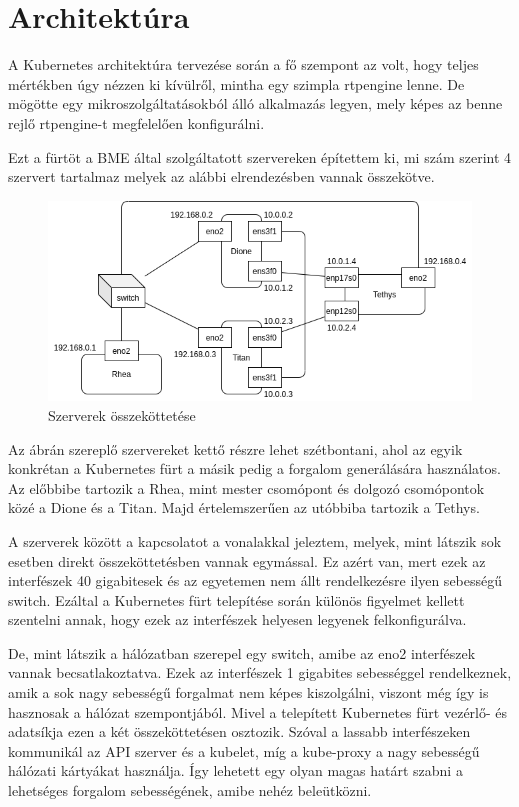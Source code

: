 \chapter{Architektúra}

A Kubernetes architektúra tervezése során a fő szempont az volt, hogy teljes
mértékben úgy nézzen ki kívülről, mintha egy szimpla rtpengine lenne. De 
mögötte egy mikroszolgáltatásokból álló alkalmazás legyen, mely képes
az benne rejlő rtpengine-t megfelelően konfigurálni.

Ezt a fürtöt a BME által szolgáltatott szervereken építettem ki, mi szám szerint
4 szervert tartalmaz melyek az alábbi elrendezésben vannak összekötve.

\begin{figure}[!ht]
	\centering
	\includegraphics[width=1\textwidth, keepaspectratio]{figures/servers.png}
	\caption{Szerverek összeköttetése}
	\label{fig:servers}
\end{figure}

Az ábrán szereplő szervereket kettő részre lehet szétbontani, ahol az egyik
konkrétan a Kubernetes fürt a másik pedig a forgalom generálására használatos.
Az előbbibe tartozik a Rhea, mint mester csomópont és dolgozó csomópontok közé 
a Dione és a Titan. Majd értelemszerűen az utóbbiba tartozik a Tethys. 

A szerverek között a kapcsolatot a vonalakkal jeleztem, melyek, mint látszik
sok esetben direkt összeköttetésben vannak egymással. Ez azért van, mert ezek
az interfészek 40 gigabitesek és az egyetemen nem állt rendelkezésre ilyen 
sebességű switch. Ezáltal a Kubernetes fürt telepítése során különös figyelmet
kellett szentelni annak, hogy ezek az interfészek helyesen legyenek felkonfigurálva.

De, mint látszik a hálózatban szerepel egy switch, amibe az eno2 interfészek vannak
becsatlakoztatva. Ezek az interfészek 1 gigabites sebességgel rendelkeznek, amik
a sok nagy sebességű forgalmat nem képes kiszolgálni, viszont még így is hasznosak
a hálózat szempontjából. Mivel a telepített Kubernetes fürt vezérlő- és adatsíkja
ezen a két összeköttetésen osztozik. Szóval a lassabb interfészeken kommunikál az
API szerver és a kubelet, míg a kube-proxy a nagy sebességű hálózati kártyákat 
használja. Így lehetett egy olyan magas határt szabni a lehetséges forgalom
sebességének, amibe nehéz beleütközni. 

